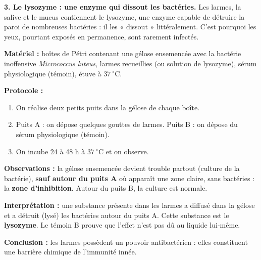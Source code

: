 \documentclass[11pt]{article}
\newcommand{\cle}[1]{{\popxbold\color{popdark}#1}}
\begin{document}
\textbf{3. Le lysozyme : une enzyme qui dissout les bactéries.} Les larmes, la salive et le mucus contiennent le \cle{lysozyme}, une enzyme capable de détruire la paroi de nombreuses bactéries : il les « dissout » littéralement. C'est pourquoi les yeux, pourtant exposés en permanence, sont rarement infectés.

\begin{experience}
\textbf{Matériel :} boîtes de Pétri contenant une gélose ensemencée avec la bactérie inoffensive \emph{Micrococcus luteus}, larmes recueillies (ou solution de lysozyme), sérum physiologique (témoin), étuve à $37\ ^\circ\mathrm{C}$.\par
\textbf{Protocole :}
\begin{enumerate}
\item On réalise deux petits puits dans la gélose de chaque boîte.
\item Puits A : on dépose quelques gouttes de larmes. Puits B : on dépose du sérum physiologique (témoin).
\item On incube 24 à 48 h à $37\ ^\circ\mathrm{C}$ et on observe.
\end{enumerate}
\textbf{Observations :} la gélose ensemencée devient trouble partout (culture de la bactérie), \textbf{sauf autour du puits A} où apparaît une zone claire, sans bactéries : la \textbf{zone d'inhibition}. Autour du puits B, la culture est normale.\par
\textbf{Interprétation :} une substance présente dans les larmes a diffusé dans la gélose et a détruit (lysé) les bactéries autour du puits A. Cette substance est le \textbf{lysozyme}. Le témoin B prouve que l'effet n'est pas dû au liquide lui-même.\par
\textbf{Conclusion :} les larmes possèdent un pouvoir antibactérien : elles constituent une barrière chimique de l'immunité innée.
\end{experience}
\end{document}
